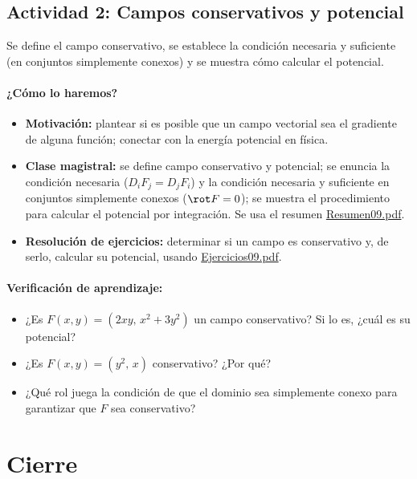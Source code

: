 \documentclass[a4,11pt]{aleph-notas}
\begin{document}
\subsection*{Actividad 2: Campos conservativos y potencial}
Se define el campo conservativo, se establece la condición necesaria y suficiente (en conjuntos simplemente conexos) y se muestra cómo calcular el potencial.

\paragraph{¿Cómo lo haremos?}
\begin{itemize}[leftmargin=*]
    \item \textbf{Motivación:} plantear si es posible que un campo vectorial sea el gradiente de alguna función; conectar con la energía potencial en física.
    \item \textbf{Clase magistral:} se define campo conservativo y potencial; se enuncia la condición necesaria ($D_iF_j=D_jF_i$) y la condición necesaria y suficiente en conjuntos simplemente conexos ($\rot F=0$); se muestra el procedimiento para calcular el potencial por integración. Se usa el resumen \href{https://andres-merino.github.io/MatematicaIII-05-N0051/01Resumen/Resumen09.pdf}{Resumen09.pdf}.
    \item \textbf{Resolución de ejercicios:} determinar si un campo es conservativo y, de serlo, calcular su potencial, usando \href{https://andres-merino.github.io/MatematicaIII-05-N0051/04Ejercicios/Ejercicios09.pdf}{Ejercicios09.pdf}.
\end{itemize}

\paragraph{Verificación de aprendizaje:}
\begin{itemize}[leftmargin=*]
    \item ¿Es $F(x,y)=(2xy,\,x^2+3y^2)$ un campo conservativo? Si lo es, ¿cuál es su potencial?
    \item ¿Es $F(x,y)=(y^2,\,x)$ conservativo? ¿Por qué?
    \item ¿Qué rol juega la condición de que el dominio sea simplemente conexo para garantizar que $F$ sea conservativo?
\end{itemize}

\section*{Cierre}
\end{document}
